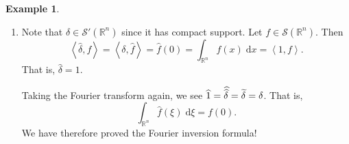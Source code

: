 \documentclass{book}
\newcommand{\scrS}{\mathscr{S}}
\newcommand{\bbR}{\mathbb{R}}
\renewcommand{\d}{\mathrm{d}}
\newcommand{\angles}[1]{\left\langle {#1} \right\rangle}
\theoremstyle{definition}
\newtheorem{example}[theorem]{Example}
\theoremstyle{remark}
\numberwithin{equation}{chapter}
\begin{document}
\begin{example}
    \begin{enumerate}[label=(\arabic*)]
        \item Note that $\delta \in \scrS'(\bbR^n)$ since it has compact support. Let $f \in \scrS(\bbR^n)$. Then 
        \begin{equation}
            \angles{ \widehat{\delta}, f } = \angles{ \delta,\widehat{f} } = \widehat{f}(0) = \int_{\bbR^n} f(x) \; \d x = \angles{ 1, f }.
        \end{equation}
        That is, $\widehat{\delta} = 1$.
        
        Taking the Fourier transform again, we see $\widehat{1} = \skew{3}\widehat{\widehat{\delta}} = \widetilde{\delta} = \delta$. That is,
        \begin{equation}
            \int_{\bbR^n} \widehat{f}(\xi) \; \d\xi = f(0).
        \end{equation}
        We have therefore proved the Fourier inversion formula!


\end{enumerate}
\end{example}
\end{document}
